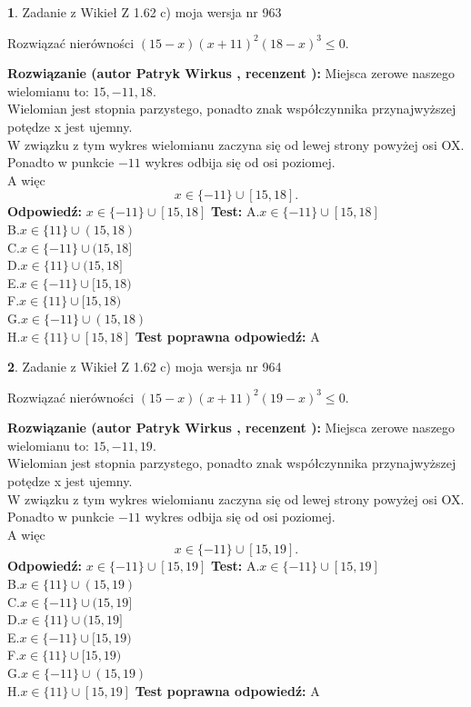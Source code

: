 \documentclass[12pt, a4paper]{article}
\theoremstyle{definition} %
\newtheorem{zad}{}
\newcommand{\zadStart}[1]{\begin{zad}#1\newline}
\newcommand{\zadStop}{\end{zad}}
\newcommand{\rozwStart}[2]{\noindent \textbf{Rozwiązanie (autor #1 , recenzent #2): }\newline}
\newcommand{\rozwStop}{\newline}
\newcommand{\odpStart}{\noindent \textbf{Odpowiedź:}\newline}
\newcommand{\odpStop}{\newline}
\newcommand{\testStart}{\noindent \textbf{Test:}\newline}
\newcommand{\testStop}{\newline}
\newcommand{\kluczStart}{\noindent \textbf{Test poprawna odpowiedź:}\newline}
\newcommand{\kluczStop}{\newline}
\begin{document}
\zadStart{Zadanie z Wikieł Z 1.62 c) moja wersja nr 963}

Rozwiązać nierówności $(15-x)(x+11)^{2}(18-x)^{3}\le0$.
\zadStop
\rozwStart{Patryk Wirkus}{}
Miejsca zerowe naszego wielomianu to: $15, -11, 18$.\\
Wielomian jest stopnia parzystego, ponadto znak współczynnika przy\linebreak najwyższej potędze x jest ujemny.\\ W związku z tym wykres wielomianu zaczyna się od lewej strony powyżej osi OX.\\
Ponadto w punkcie $-11$ wykres odbija się od osi poziomej.\\
A więc $$x \in \{-11\} \cup [15,18].$$
\rozwStop
\odpStart
$x \in \{-11\} \cup [15,18]$
\odpStop
\testStart
A.$x \in \{-11\} \cup [15,18]$\\
B.$x \in \{11\} \cup (15,18)$\\
C.$x \in \{-11\} \cup (15,18]$\\
D.$x \in \{11\} \cup (15,18]$\\
E.$x \in \{-11\} \cup [15,18)$\\
F.$x \in \{11\} \cup [15,18)$\\
G.$x \in \{-11\} \cup (15,18)$\\
H.$x \in \{11\} \cup [15,18]$
\testStop
\kluczStart
A
\kluczStop



\zadStart{Zadanie z Wikieł Z 1.62 c) moja wersja nr 964}

Rozwiązać nierówności $(15-x)(x+11)^{2}(19-x)^{3}\le0$.
\zadStop
\rozwStart{Patryk Wirkus}{}
Miejsca zerowe naszego wielomianu to: $15, -11, 19$.\\
Wielomian jest stopnia parzystego, ponadto znak współczynnika przy\linebreak najwyższej potędze x jest ujemny.\\ W związku z tym wykres wielomianu zaczyna się od lewej strony powyżej osi OX.\\
Ponadto w punkcie $-11$ wykres odbija się od osi poziomej.\\
A więc $$x \in \{-11\} \cup [15,19].$$
\rozwStop
\odpStart
$x \in \{-11\} \cup [15,19]$
\odpStop
\testStart
A.$x \in \{-11\} \cup [15,19]$\\
B.$x \in \{11\} \cup (15,19)$\\
C.$x \in \{-11\} \cup (15,19]$\\
D.$x \in \{11\} \cup (15,19]$\\
E.$x \in \{-11\} \cup [15,19)$\\
F.$x \in \{11\} \cup [15,19)$\\
G.$x \in \{-11\} \cup (15,19)$\\
H.$x \in \{11\} \cup [15,19]$
\testStop
\kluczStart
A
\kluczStop
\end{document}
